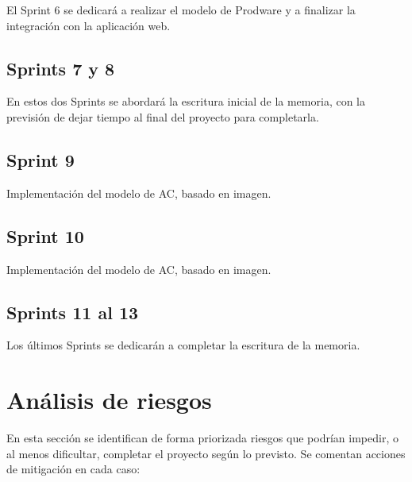El Sprint 6 se dedicará a realizar el modelo de Prodware y a finalizar la integración con la aplicación web.

\subsection{Sprints 7 y 8}

En estos dos Sprints se abordará la escritura inicial de la memoria, con la previsión de dejar tiempo al final del proyecto para completarla.

\subsection{Sprint 9}

Implementación del modelo de AC, basado en imagen.

\subsection{Sprint 10}

Implementación del modelo de AC, basado en imagen.

\subsection{Sprints 11 al 13}

Los últimos Sprints se dedicarán a completar la escritura de la memoria.

\section{Análisis de riesgos}

En esta sección se identifican de forma priorizada riesgos que podrían impedir, o al menos dificultar, completar el proyecto según lo previsto. Se comentan acciones de mitigación en cada caso:

